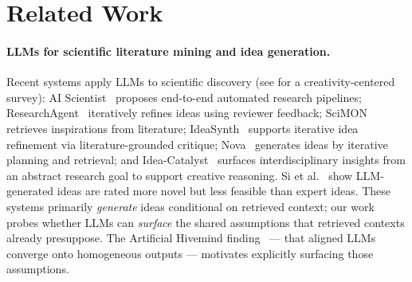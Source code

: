\documentclass[11pt]{article}
\begin{document}
\section{Related Work}

\paragraph{LLMs for scientific literature mining and idea generation.}
Recent systems apply LLMs to scientific discovery (see \citealp{shahhosseini2025survey} for a creativity-centered survey): AI Scientist~\cite{wang2024ai} proposes end-to-end automated research pipelines; ResearchAgent~\cite{baek2024researchagent} iteratively refines ideas using reviewer feedback; SciMON~\cite{wang2024scimon} retrieves inspirations from literature; IdeaSynth~\cite{pu2024ideasynth} supports iterative idea refinement via literature-grounded critique; Nova~\cite{hu2024nova} generates ideas by iterative planning and retrieval; and Idea-Catalyst~\cite{kargupta2026catalyst} surfaces interdisciplinary insights from an abstract research goal to support creative reasoning. Si et al.~\cite{si2024ideas} show LLM-generated ideas are rated more novel but less feasible than expert ideas. These systems primarily \emph{generate} ideas conditional on retrieved context; our work probes whether LLMs can \emph{surface} the shared assumptions that retrieved contexts already presuppose. The Artificial Hivemind finding~\cite{jiang2025hivemind} --- that aligned LLMs converge onto homogeneous outputs --- motivates explicitly surfacing those assumptions.
\end{document}
